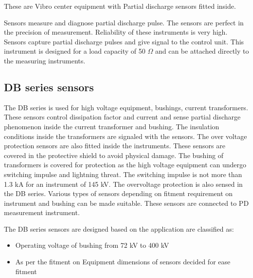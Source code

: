  
These are Vibro center equipment with Partial discharge sensors fitted inside. 

Sensors measure and diagnose partial discharge pulse. The sensors are perfect in the precision of measurement. Reliability of these instruments is very high. Sensors capture partial discharge pulses and give signal to the control unit. This instrument is designed for a load capacity of 50 $\Omega$ and can be attached directly to the measuring instruments\setlength{\parskip}{0em}.
 
\subsection{DB series sensors}
The DB series is used for high voltage equipment, bushings, current transformers. These sensors control dissipation factor and current and sense partial discharge phenomenon inside the current transformer and bushing. The insulation conditions inside the transformers are signaled with the sensors. The over voltage protection sensors are also fitted inside the instruments. These sensors are covered in the protective shield to avoid physical damage. The bushing of transformers is covered for protection as the high voltage equipment can undergo switching impulse and lightning threat. The switching impulse is not more than 1.3 kA for an instrument of 145 kV. The overvoltage protection is also sensed in the DB series. Various types of sensors depending on fitment requirement on instrument and bushing can be made suitable. These sensors are connected to PD measurement instrument.

The DB series sensors are designed based on the application are classified as:
\begin{itemize}
\item Operating voltage of bushing from 72 kV to 400 kV
\item As per the fitment on Equipment dimensions of sensors decided for ease fitment
\end{itemize}

